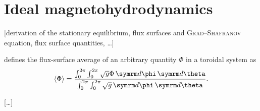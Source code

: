 \section{Ideal magnetohydrodynamics}

[derivation of the stationary equilibrium, flux surfaces and \textsc{Grad}--\textsc{Shafranov} equation, flux surface quantities, \ldots]

\textcite{dHaeseleer91} defines the flux-surface average of an arbitrary quantity $\Phi$ in a toroidal system as
\begin{gather}
  \langle \Phi \rangle = \frac{\int_{0}^{2 \pi} \int_{0}^{2 \pi} \sqrt{g} \Phi \, \diff \phi \, \diff \theta}{\int_{0}^{2 \pi} \int_{0}^{2 \pi} \sqrt{g} \, \diff \phi \, \diff \theta}. \label{eq:flux_surface_avg}
\end{gather}

[\ldots]

